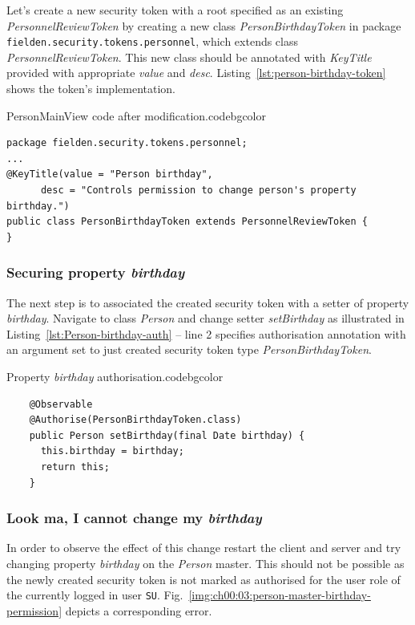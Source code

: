   Let's create a new security token with a root specified as an existing \emph{PersonnelReviewToken} by creating a new class \emph{PersonBirthdayToken} in package \texttt{fielden.security.tokens.personnel}, which extends class \emph{PersonnelReviewToken}.
  This new class should be annotated with \emph{KeyTitle} provided with appropriate \emph{value} and \emph{desc}.
  Listing~\ref{lst:person-birthday-token} shows the token's implementation.

 \begin{code}{PersonMainView code after modification.}{\label{lst:person-birthday-token}}{codebgcolor}
    \begin{lstlisting}
package fielden.security.tokens.personnel;
...
@KeyTitle(value = "Person birthday", 
	  desc = "Controls permission to change person's property birthday.")
public class PersonBirthdayToken extends PersonnelReviewToken {
}
    \end{lstlisting}
  \end{code}  
  
  \subsubsection*{Securing property \emph{birthday}}
  The next step is to associated the created security token with a setter of property \emph{birthday}.
  Navigate to class \emph{Person} and change setter \emph{setBirthday} as illustrated in Listing~\ref{lst:Person-birthday-auth} -- line 2 specifies authorisation annotation with an argument set to just created security token type \emph{PersonBirthdayToken}.

  \begin{code}{Property \emph{birthday} authorisation.}{\label{lst:Person-birthday-auth}}{codebgcolor}
    \begin{lstlisting}
    @Observable
    @Authorise(PersonBirthdayToken.class)
    public Person setBirthday(final Date birthday) {
      this.birthday = birthday;
      return this;
    }
    \end{lstlisting}
  \end{code}

  \subsubsection*{Look ma, I cannot change my \emph{birthday}}
  In order to observe the effect of this change restart the client and server and try changing property \emph{birthday} on the \emph{Person} master.
  This should not be possible as the newly created security token is not marked as authorised for the user role of the currently logged in user \texttt{SU}.
  Fig.~\ref{img:ch00:03:person-master-birthday-permission} depicts a corresponding error.
  
